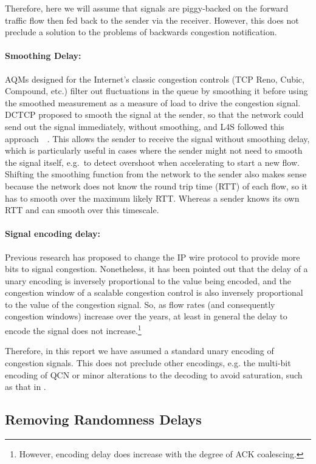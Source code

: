 Therefore, here we will assume that signals are piggy-backed on the forward traffic flow then fed back to the sender via the receiver. However, this does not preclude a solution to the problems of backwards congestion notification.

\paragraph{Smoothing Delay:} AQMs designed for the Internet's classic congestion controls (TCP Reno, Cubic, Compound, etc.) filter out fluctuations in the queue by smoothing it before using the smoothed measurement as a measure of load to drive the congestion signal. DCTCP proposed to smooth the signal at the sender, so that the network could send out the signal immediately, without smoothing, and L4S followed this approach~~\cite{Briscoe16a:l4s-arch_ID}. This allows the sender to receive the signal without smoothing delay, which is particularly useful in cases where the sender might not need to smooth the signal itself, e.g.\ to detect overshoot when accelerating to start a new flow. Shifting the smoothing function from the network to the sender also makes sense because the network does not know the round trip time (RTT) of each flow, so it has to smooth over the maximum likely RTT. Whereas a sender knows its own RTT and can smooth over this timescale.

\paragraph{Signal encoding delay:} Previous research has proposed to change the IP wire protocol to provide more bits to signal congestion. Nonetheless, it has been pointed out that the delay of a unary encoding is inversely proportional to the value being encoded, and the congestion window of a scalable congestion control is also inversely proportional to the value of the congestion signal. So, as flow rates (and consequently congestion windows) increase over the years, at least in general the delay to encode the signal does not increase.\footnote{However, encoding delay does increase with the degree of ACK coalescing.}

Therefore, in this report we have assumed a standard unary encoding of congestion signals. This does not preclude other encodings, e.g. the multi-bit encoding of QCN or minor alterations to the decoding to avoid saturation, such as that in \cite{Briscoe17a:CC_Tensions_TR}.

\subsection{Removing Randomness Delays}\label{sec:rand_delay}

